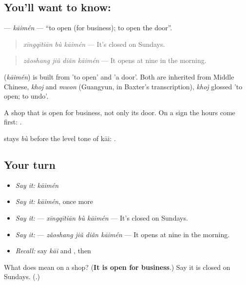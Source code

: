 \subsection*{You'll want to know: }
\textbf{} — \emph{kāimén} — \textquotedblleft{}to open (for business); to open the door\textquotedblright{}.

\begin{quote}
\textbf{} \emph{xīngqītiān bù kāimén} — It's closed on Sundays.
\end{quote}

\begin{quote}
\textbf{} \emph{zǎoshang jiǔ diǎn kāimén} — It opens at nine in the morning.
\end{quote}

\begin{cousinweb}
\textbf{} (\emph{kāimén}) is built from  'to open' and  'a door'. Both are inherited from Middle Chinese, \emph{khoj} and \emph{mwon} (Guangyun, in Baxter's transcription), \emph{khoj} glossed 'to open; to undo'.
\end{cousinweb}

\begin{grammarlens}[title={What you've built}]
A shop that  is open for business, not only its door. On a sign the hours come first: .

 stays \emph{bù} before the level tone of kāi: .
\end{grammarlens}

\subsection*{Your turn}
\begin{itemize}
\raggedright
  \item \emph{Say it:} \emph{kāimén}
  \item \emph{Say it:} \emph{kāimén}, once more
  \item \emph{Say it:}  — \emph{xīngqītiān bù kāimén} — It's closed on Sundays.
  \item \emph{Say it:}  — \emph{zǎoshang jiǔ diǎn kāimén} — It opens at nine in the morning.
  \item \emph{Recall:} say \emph{kāi} and , then 
\end{itemize}

\begin{tcolorbox}[breakable,colback=teal!4,colframe=teal!35!black,title={Before you move on}]
What does  mean on a shop? (\textbf{It is open for business}.) Say it is closed on Sundays. (\textbf{}.)
\end{tcolorbox}
